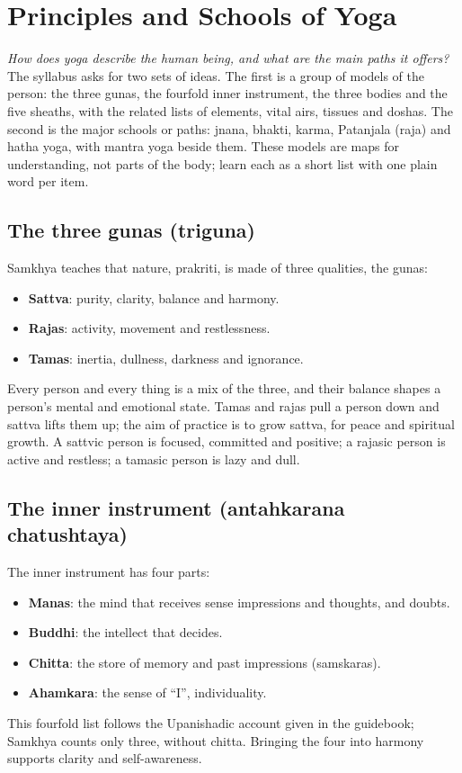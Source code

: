 \chapter{Principles and Schools of Yoga}
\label{ch:principles-schools}

\emph{How does yoga describe the human being, and what are the main paths it offers?}
The syllabus asks for two sets of ideas. The first is a group of models of the person: the three gunas, the fourfold inner instrument, the three bodies and the five sheaths, with the related lists of elements, vital airs, tissues and doshas. The second is the major schools or paths: jnana, bhakti, karma, Patanjala (raja) and hatha yoga, with mantra yoga beside them. These models are maps for understanding, not parts of the body; learn each as a short list with one plain word per item.

\section{The three gunas (triguna)}

Samkhya teaches that nature, prakriti, is made of three qualities, the gunas:
\begin{itemize}
\item \textbf{Sattva}: purity, clarity, balance and harmony.
\item \textbf{Rajas}: activity, movement and restlessness.
\item \textbf{Tamas}: inertia, dullness, darkness and ignorance.
\end{itemize}
Every person and every thing is a mix of the three, and their balance shapes a person's mental and emotional state. Tamas and rajas pull a person down and sattva lifts them up; the aim of practice is to grow sattva, for peace and spiritual growth. A sattvic person is focused, committed and positive; a rajasic person is active and restless; a tamasic person is lazy and dull.

\section{The inner instrument (antahkarana chatushtaya)}

The inner instrument has four parts:
\begin{itemize}
\item \textbf{Manas}: the mind that receives sense impressions and thoughts, and doubts.
\item \textbf{Buddhi}: the intellect that decides.
\item \textbf{Chitta}: the store of memory and past impressions (samskaras).
\item \textbf{Ahamkara}: the sense of ``I'', individuality.
\end{itemize}
This fourfold list follows the Upanishadic account given in the guidebook; Samkhya counts only three, without chitta. Bringing the four into harmony supports clarity and self-awareness.

